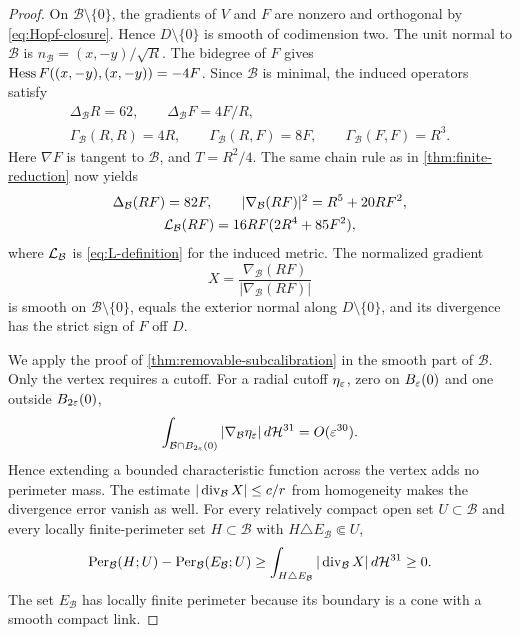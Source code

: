 \begin{proof}
On \(\mathcal B\setminus\{0\}\), the gradients of \(V\) and
\(F\) are nonzero and orthogonal by \eqref{eq:Hopf-closure}.
Hence \(D\setminus\{0\}\) is smooth of codimension two.
The unit normal to \(\mathcal B\) is
\(n_{\mathcal B}=(x,-y)/\sqrt R\). The bidegree of \(F\) gives
\(\operatorname{Hess} F((x,-y),(x,-y))=-4F\). Since \(\mathcal B\) is minimal,
the induced operators satisfy
\begin{equation}\label{eq:Hopf-intrinsic-closure}
 \begin{gathered}
 \Delta_{\mathcal B}R=62,\qquad
 \Delta_{\mathcal B}F=4F/R,\\
 \Gamma_{\mathcal B}(R,R)=4R,\qquad
 \Gamma_{\mathcal B}(R,F)=8F,\qquad
 \Gamma_{\mathcal B}(F,F)=R^3.
 \end{gathered}
\end{equation}
Here \(\nabla F\) is tangent to \(\mathcal B\), and \(T=R^2/4\).
The same chain rule as in \cref{thm:finite-reduction} now yields
\begin{equation}\label{eq:Hopf-intrinsic-defect}
 \begin{gathered}
 \Delta_{\mathcal B}(RF)=82F,\qquad
 |\nabla_{\mathcal B}(RF)|^2=R^5+20RF^2,\\
 \mathcal L_{\mathcal B}(RF)=16RF(2R^4+85F^2),
 \end{gathered}
\end{equation}
where \(\mathcal L_{\mathcal B}\) is \eqref{eq:L-definition} for the
induced metric. The normalized gradient
\[
 X=\frac{\nabla_{\mathcal B}(RF)}{|\nabla_{\mathcal B}(RF)|}
\]
is smooth on \(\mathcal B\setminus\{0\}\), equals the exterior
normal along \(D\setminus\{0\}\), and its divergence has the
strict sign of \(F\) off \(D\).

We apply the proof of \cref{thm:removable-subcalibration} in the
smooth part of \(\mathcal B\). Only the vertex requires a cutoff.
For a radial cutoff \(\eta_\varepsilon\), zero on \(B_\varepsilon(0)\) and
one outside \(B_{2\varepsilon}(0)\),
\[
 \int_{\mathcal B\cap B_{2\varepsilon}(0)}
       |\nabla_{\mathcal B}\eta_\varepsilon|\,d\mathcal H^{31}
 =O(\varepsilon^{30}).
\]
Hence extending a bounded characteristic function across the vertex
adds no perimeter mass. The estimate $|\operatorname{div}_{\mathcal B}X|\le c/r$
from homogeneity makes the divergence error vanish as well. For every relatively compact open set \(U\subset\mathcal B\)
and every locally finite-perimeter set \(H\subset\mathcal B\) with
\(H\triangle E_{\mathcal B}\Subset U\),
\begin{equation}\label{eq:Hopf-intrinsic-comparison}
 \operatorname{Per}_{\mathcal B}(H;U)-\operatorname{Per}_{\mathcal B}(E_{\mathcal B};U)
 \geq\int_{H\triangle E_{\mathcal B}}
       |\operatorname{div}_{\mathcal B}X|\,d\mathcal H^{31}\geq0.
\end{equation}
The set \(E_{\mathcal B}\) has locally finite perimeter because
its boundary is a cone with a smooth compact link.


\end{proof}
